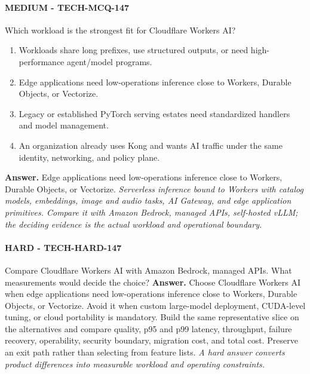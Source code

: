 \paragraph{MEDIUM - TECH-MCQ-147} Which workload is the strongest fit for Cloudflare Workers AI?
\begin{enumerate}[label=\Alph*.]
\item Workloads share long prefixes, use structured outputs, or need high-performance agent/model programs.
\item Edge applications need low-operations inference close to Workers, Durable Objects, or Vectorize.
\item Legacy or established PyTorch serving estates need standardized handlers and model management.
\item An organization already uses Kong and wants AI traffic under the same identity, networking, and policy plane.
\end{enumerate}
\textbf{Answer.} Edge applications need low-operations inference close to Workers, Durable Objects, or Vectorize.
\textit{Serverless inference bound to Workers with catalog models, embeddings, image and audio tasks, AI Gateway, and edge application primitives. Compare it with Amazon Bedrock, managed APIs, self-hosted vLLM; the deciding evidence is the actual workload and operational boundary.}
\paragraph{HARD - TECH-HARD-147} Compare Cloudflare Workers AI with Amazon Bedrock, managed APIs. What measurements would decide the choice?
\textbf{Answer.} Choose Cloudflare Workers AI when edge applications need low-operations inference close to Workers, Durable Objects, or Vectorize. Avoid it when custom large-model deployment, CUDA-level tuning, or cloud portability is mandatory. Build the same representative slice on the alternatives and compare quality, p95 and p99 latency, throughput, failure recovery, operability, security boundary, migration cost, and total cost. Preserve an exit path rather than selecting from feature lists.
\textit{A hard answer converts product differences into measurable workload and operating constraints.}
